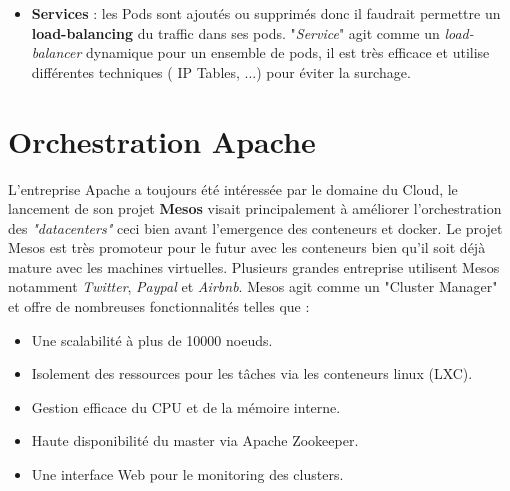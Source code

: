 \begin{onehalfspace}
\begin{itemize}
\item \textbf{Services} : les Pods sont ajoutés ou supprimés donc il faudrait permettre un \textbf{load-balancing} du traffic dans ses pods. "\emph{Service}" agit comme un \emph{load-balancer} dynamique pour un ensemble de pods, il est très efficace et utilise différentes techniques ( IP Tables, ...) pour éviter la surchage.

\end{itemize}

\section{Orchestration Apache}
L'entreprise Apache a toujours été intéressée par le domaine du Cloud, le lancement de son projet \textbf{Mesos} visait principalement à améliorer l'orchestration des \emph{"datacenters"} ceci bien avant l'emergence des conteneurs et docker. Le projet Mesos est très promoteur pour le futur avec les conteneurs bien qu'il soit déjà mature avec les machines virtuelles. Plusieurs grandes entreprise utilisent Mesos notamment \emph{Twitter}, \emph{Paypal} et \emph{Airbnb}.
Mesos agit comme un "Cluster Manager" et offre de nombreuses fonctionnalités telles que :
\begin{itemize}
\item Une scalabilité à plus de 10000 noeuds.
\item Isolement des ressources pour les tâches via les conteneurs linux (LXC).
\item Gestion efficace du CPU et de la mémoire interne.
\item Haute disponibilité du master via Apache Zookeeper.
\item Une interface Web pour le monitoring des clusters.
\end{itemize}

\end{onehalfspace}
